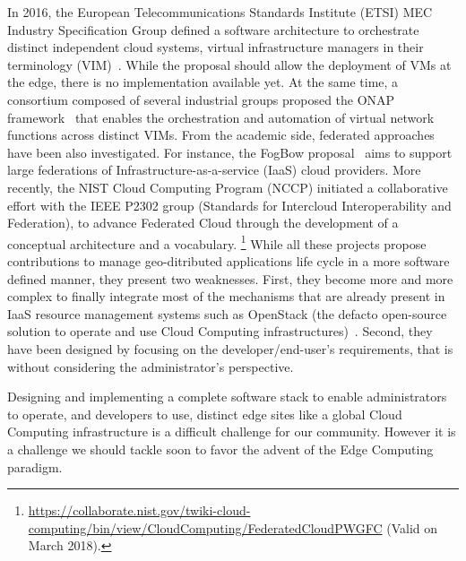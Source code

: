In 2016, the European Telecommunications Standards Institute (ETSI) MEC
Industry Specification Group defined  a software architecture
to orchestrate distinct independent cloud systems, \aka virtual
infrastructure managers in their terminology
(VIM)~\cite{7574435}. While the proposal should allow the deployment
of VMs at the edge, there is no implementation available yet.  At the
same time, a consortium composed of several industrial groups proposed
the ONAP framework~\cite{onap} that enables the orchestration and
automation of virtual network functions across distinct VIMs.  From
the academic side, federated approaches have been also investigated.
For instance, the FogBow proposal~\cite{brasileiro2016fogbow} aims to
support large federations of Infrastructure-as-a-service (IaaS) cloud
providers. More recently, the NIST Cloud Computing Program (NCCP)
initiated a collaborative effort with the IEEE P2302 group (Standards for Intercloud Interoperability and
Federation), to advance Federated Cloud through the development
of a conceptual architecture and a vocabulary.
\footnote{\url{https://collaborate.nist.gov/twiki-cloud-computing/bin/view/CloudComputing/FederatedCloudPWGFC} (Valid on March 2018).}
%
While all these projects propose contributions to manage
geo-ditributed applications life cycle in a more software defined manner, they present two
weaknesses. First, they become more and more complex to finally
integrate most of the mechanisms that are already present in
IaaS resource management systems such as OpenStack (the defacto open-source solution
to operate and use Cloud Computing infrastructures)~\cite{}.  Second,
they have been designed by focusing on the developer/end-user's
requirements, that is without considering the administrator's
perspective.

Designing and implementing a complete software stack to enable
administrators to operate, and developers to use, distinct edge sites
like a global Cloud Computing infrastructure is a difficult challenge
for our community. However it is a challenge we should tackle soon to
favor the advent of the Edge Computing paradigm.

